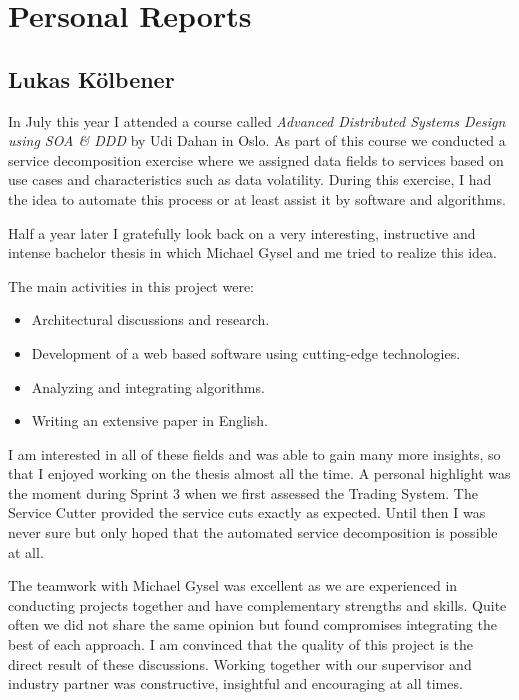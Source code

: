 \chapter{Personal Reports}

\section{Lukas Kölbener}

In July this year I attended a course called \textit{Advanced Distributed Systems Design using SOA \& DDD} by Udi Dahan in Oslo. As part of this course we conducted a service decomposition exercise where we assigned data fields to services based on use cases and characteristics such as data volatility. During this exercise, I had the idea to automate this process or at least assist it by software and algorithms. 

Half a year later I gratefully look back on a very interesting, instructive and intense bachelor thesis in which Michael Gysel and me tried to realize this idea. 

The main activities in this project were:

\begin{itemize}
	\item Architectural discussions and research.
	\item Development of a web based software using cutting-edge technologies.
	\item Analyzing and integrating algorithms.
	\item Writing an extensive paper in English.
\end{itemize}

I am interested in all of these fields and was able to gain many more insights, so that I enjoyed working on the thesis almost all the time. A personal highlight was the moment during Sprint 3 when we first assessed the Trading System. The Service Cutter provided the service cuts exactly as expected. Until then I was never sure but only hoped that the automated service decomposition is possible at all. 

The teamwork with Michael Gysel was excellent as we are experienced in conducting projects together and have complementary strengths and skills. Quite often we did not share the same opinion but found compromises integrating the best of each approach. I am convinced that the quality of this project is the direct result of these discussions. Working together with our supervisor and industry partner was constructive, insightful and encouraging at all times. 

